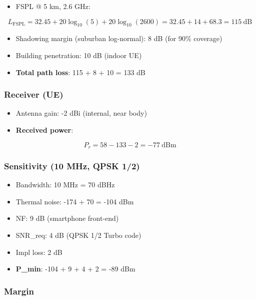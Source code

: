 \begin{itemize}
\tightlist
\item
  FSPL @ 5 km, 2.6 GHz:
\end{itemize}

\[
L_{\text{FSPL}} = 32.45 + 20\log_{10}(5) + 20\log_{10}(2600) = 32.45 + 14 + 68.3 = 115\ \text{dB}
\]

\begin{itemize}
\tightlist
\item
  Shadowing margin (suburban log-normal): 8 dB (for 90\% coverage)
\item
  Building penetration: 10 dB (indoor UE)
\item
  \textbf{Total path loss}: 115 + 8 + 10 = 133 dB
\end{itemize}

\subsubsection{Receiver (UE)}\label{receiver-ue}

\begin{itemize}
\tightlist
\item
  Antenna gain: -2 dBi (internal, near body)
\item
  \textbf{Received power}:
\end{itemize}

\[
P_r = 58 - 133 - 2 = -77\ \text{dBm}
\]

\subsubsection{Sensitivity (10 MHz, QPSK
1/2)}\label{sensitivity-10-mhz-qpsk-12}

\begin{itemize}
\tightlist
\item
  Bandwidth: 10 MHz = 70 dBHz
\item
  Thermal noise: -174 + 70 = -104 dBm
\item
  NF: 9 dB (smartphone front-end)
\item
  SNR\_req: 4 dB (QPSK 1/2 Turbo code)
\item
  Impl loss: 2 dB
\item
  \textbf{P\_min}: -104 + 9 + 4 + 2 = -89 dBm
\end{itemize}

\subsubsection{Margin}\label{margin-1}

